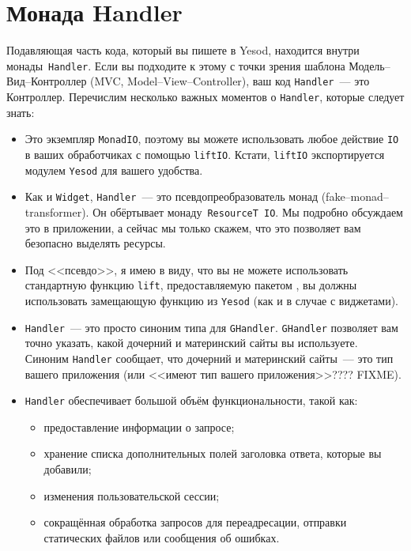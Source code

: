 \section{Монада Handler}\label{sec:handler-monad}
Подавляющая часть кода, который вы пишете в Yesod, находится внутри
монады~\lstinline!Handler!. Если вы подходите к этому с точки зрения
шаблона Модель--Вид--Контроллер (MVC, Model--View--Controller), ваш код
\lstinline!Handler!~--- это Контроллер. Перечислим несколько важных
моментов о \lstinline!Handler!, которые следует знать:
\begin{itemize}
\item Это экземпляр \lstinline!MonadIO!, поэтому вы можете
  использовать любое действие \lstinline!IO! в ваших обработчиках с
  помощью \lstinline!liftIO!. Кстати, \lstinline!liftIO! экспортируется
  модулем \lstinline!Yesod! для вашего удобства.
\item Как и \lstinline!Widget!, \lstinline!Handler!~--- это
  псевдопреобразователь монад (fake--monad--transformer). Он обёртывает
  монаду~\lstinline!ResourceT IO!. Мы подробно обсуждаем это в
  приложении, а
  сейчас мы только скажем, что это позволяет вам безопасно выделять
  ресурсы.
\item Под <<псевдо>>, я имею в виду, что вы не можете использовать
  стандартную функцию \lstinline!lift!, предоставляемую пакетом
  ,
  вы должны использовать замещающую функцию из \lstinline!Yesod! (как и в
  случае с виджетами).
\item \lstinline!Handler!~--- это просто синоним типа для
  \lstinline!GHandler!. \lstinline!GHandler! позволяет вам точно
  указать, какой дочерний и материнский сайты вы используете. Синоним
  \lstinline!Handler! сообщает, что дочерний и материнский сайты~---
  это тип вашего приложения (или <<имеют тип вашего приложения>>????
  FIXME).
\item \lstinline!Handler! обеспечивает большой объём функциональности,
  такой как:
\begin{itemize}
\item предоставление информации о запросе;
\item хранение списка дополнительных полей заголовка ответа, которые
  вы добавили;
\item изменения пользовательской сессии;
\item сокращённая обработка запросов для переадресации, отправки
  статических файлов или сообщения об ошибках.
\end{itemize}
\end{itemize}

